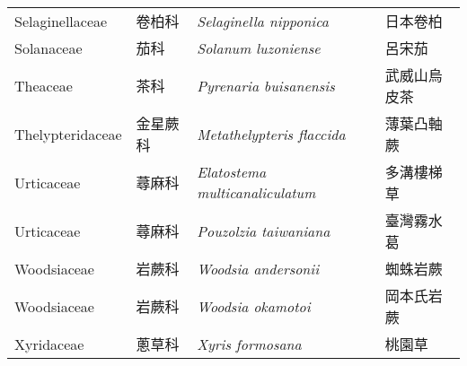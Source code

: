 \begin{longtable}{p{3cm}p{2cm}p{5cm}p{3cm}}
    Selaginellaceae & 卷柏科 & \textit{Selaginella nipponica}  & 日本卷柏\\
    Solanaceae & 茄科 & \textit{Solanum luzoniense}  & 呂宋茄\\
    Theaceae & 茶科 & \textit{Pyrenaria buisanensis}  & 武威山烏皮茶\\
    Thelypteridaceae & 金星蕨科 & \textit{Metathelypteris flaccida}  & 薄葉凸軸蕨\\
    Urticaceae & 蕁麻科 & \textit{Elatostema multicanaliculatum}  & 多溝樓梯草\\
    Urticaceae & 蕁麻科 & \textit{Pouzolzia taiwaniana}  & 臺灣霧水葛\\
    Woodsiaceae & 岩蕨科 & \textit{Woodsia andersonii}  & 蜘蛛岩蕨\\
    Woodsiaceae & 岩蕨科 & \textit{Woodsia okamotoi}  & 岡本氏岩蕨\\
    Xyridaceae & 蔥草科 & \textit{Xyris formosana}  & 桃園草\\
    \bottomrule
    \end{longtable}

